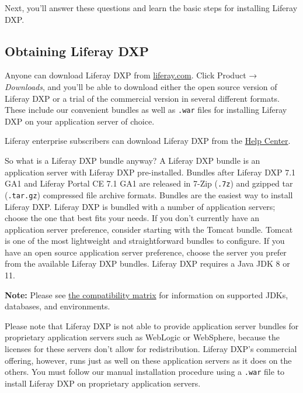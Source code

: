 Next, you'll answer these questions and learn the basic steps for
installing Liferay DXP.

\subsection{Obtaining Liferay DXP}\label{obtaining-liferay-dxp}

Anyone can download Liferay DXP from
\href{https://www.liferay.com}{liferay.com}. Click Product →
\emph{Downloads}, and you'll be able to download either the open source
version of Liferay DXP or a trial of the commercial version in several
different formats. These include our convenient bundles as well as
\texttt{.war} files for installing Liferay DXP on your application
server of choice.

Liferay enterprise subscribers can download Liferay DXP from the
\href{https://help.liferay.com/hc}{Help Center}.

So what is a Liferay DXP bundle anyway? A Liferay DXP bundle is an
application server with Liferay DXP pre-installed. Bundles after Liferay
DXP 7.1 GA1 and Liferay Portal CE 7.1 GA1 are released in 7-Zip
(\texttt{.7z}) and gzipped tar (\texttt{.tar.gz}) compressed file
archive formats. Bundles are the easiest way to install Liferay DXP.
Liferay DXP is bundled with a number of application servers; choose the
one that best fits your needs. If you don't currently have an
application server preference, consider starting with the Tomcat bundle.
Tomcat is one of the most lightweight and straightforward bundles to
configure. If you have an open source application server preference,
choose the server you prefer from the available Liferay DXP bundles.
Liferay DXP requires a Java JDK 8 or 11.

\noindent\hrulefill

\textbf{Note:} Please see
\href{https://www.liferay.com/documents/10182/246659966/Liferay+DXP+7.1+Compatibility+Matrix.pdf/c8805b72-c693-1f26-3f2d-731ffc301366}{the
compatibility matrix} for information on supported JDKs, databases, and
environments.

\noindent\hrulefill

Please note that Liferay DXP is not able to provide application server
bundles for proprietary application servers such as WebLogic or
WebSphere, because the licenses for these servers don't allow for
redistribution. Liferay DXP's commercial offering, however, runs just as
well on these application servers as it does on the others. You must
follow our manual installation procedure using a \texttt{.war} file to
install Liferay DXP on proprietary application servers.

